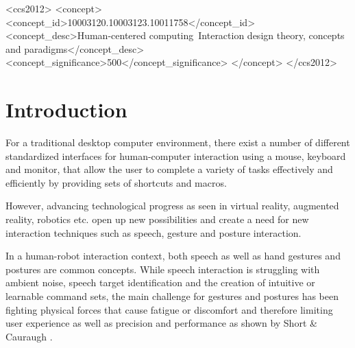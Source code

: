 \documentclass{sig-alternate-05-2015}
\begin{document}
%
%
\begin{CCSXML}
<ccs2012>
<concept>
<concept_id>10003120.10003123.10011758</concept_id>
<concept_desc>Human-centered computing~Interaction design theory, concepts and paradigms</concept_desc>
<concept_significance>500</concept_significance>
</concept>
</ccs2012>
\end{CCSXML}






%
%

%
%
\printccsdesc



\section{Introduction}

For a traditional desktop computer environment, there exist a number of different standardized interfaces for human-computer interaction using a mouse, keyboard and monitor, that allow the user to 
complete a variety of tasks effectively and efficiently by providing sets of shortcuts and macros. 

However, advancing technological progress as seen in virtual reality, augmented reality,
 robotics etc. open up new possibilities and create a need for new interaction techniques such as speech, gesture and posture interaction. 

In a human-robot interaction context, both speech as well as hand gestures and postures are common concepts. While speech interaction is struggling 
with ambient noise, speech target identification and the creation of intuitive or learnable command sets, the main challenge for gestures and postures has been fighting physical forces that cause fatigue or discomfort and therefore limiting user experience as well as precision and performance as shown by Short \& Cauraugh \cite{short1999precision}.
\end{document}
